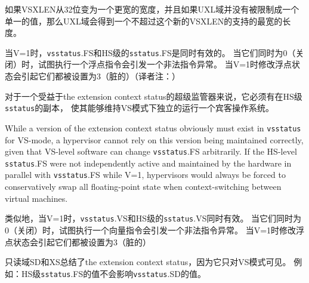 如果VSXLEN从32位变为一个更宽的宽度，并且如果UXL域并没有被限制成一个单一的值，那么UXL域会得到一个不超过这个新的VSXLEN的支持的最宽的长度。

当V=1时，{\tt vsstatus}.FS和HS级的{\tt sstatus}.FS是同时有效的。
当它们同时为0（关闭）时，试图执行一个浮点指令会引发一个非法指令异常。
当V=1时修改浮点状态会引起它们都被设置为3（脏的）（译者注：）

\begin{commentary}
  对于一个受益于the extension context status的超级监管器来说，它必须有在HS级{\tt sstatus}的副本，
  使其能够维持VS模式下独立的运行一个宾客操作系统。

While a version of the extension context status obviously must exist in
{\tt vsstatus} for VS-mode, a hypervisor cannot rely on this version
being maintained correctly, given that VS-level software can change
{\tt vsstatus}.FS arbitrarily.
If the HS-level {\tt sstatus}.FS were not independently active and
maintained by the hardware in parallel with {\tt vsstatus}.FS while V=1,
hypervisors would always be forced to conservatively swap all
floating-point state when context-switching between virtual machines.
\end{commentary}

类似地，当V=1时，{\tt vsstatus}.VS和HS级的{\tt sstatus}.VS同时有效。
当它们同时为0（关闭）时，试图执行一个向量指令会引发一个非法指令异常。
当V=1时修改浮点状态会引起它们都被设置为3（脏的）

只读域SD和XS总结了the extension context status，因为它只对VS模式可见。
例如：HS级{\tt sstatus}.FS的值不会影响{\tt vsstatus}.SD的值。

